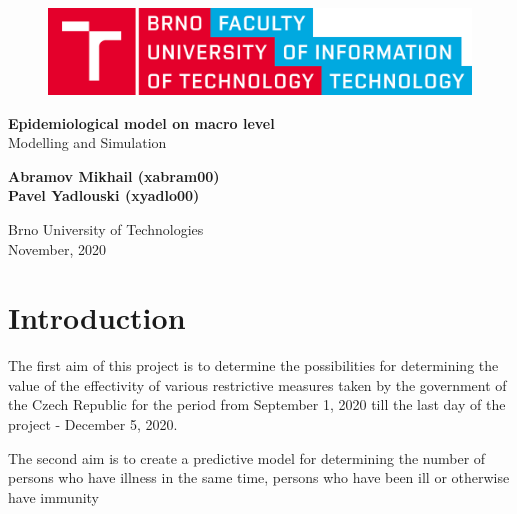 \documentclass[12pt,a4paper,english]{article}
\begin{document}
    \begin{titlepage}
        \begin{center}
            \vspace*{1cm}
        
            \begin{figure}[h!]
                \includegraphics[scale=0.12]{VUT-FIT-logo-en.png}
            \end{figure}
            \vspace{1.5cm}

            \Large{\textbf{Epidemiological model on macro level}} \\
            \large{Modelling and Simulation}

            \vspace{0.5cm}
                
            \vspace{1.5cm}
            
            \textbf{Abramov Mikhail (xabram00)} \\
            \textbf{Pavel Yadlouski (xyadlo00)} 

            \vfill
                
            \vspace{0.8cm}
        
            Brno University of Technologies\\
            November, 2020
                
        \end{center}
    \end{titlepage}

    \tableofcontents
    \newpage

    \section{Introduction}
    The first aim of this project is to determine the possibilities for determining the value of the effectivity of various restrictive measures taken by the government of the Czech Republic for the period from September 1, 2020 till the last day of the project - December 5, 2020.

    The second aim is to create a predictive model for determining the number of persons who have illness in the same time, persons who have been ill or otherwise have immunity
\end{document}
